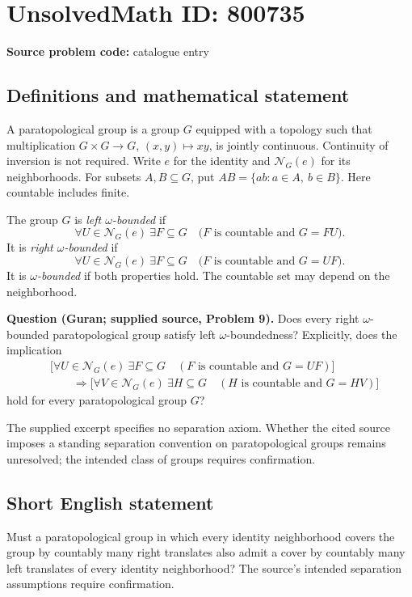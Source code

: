 \documentclass[11pt]{article}
\begin{document}
\section*{UnsolvedMath ID: 800735}
\textbf{Source problem code:} catalogue entry
\subsection{Definitions and mathematical statement}
A paratopological group is a group \(G\) equipped with a topology such that multiplication \(G\times G\to G\), \((x,y)\mapsto xy\), is jointly continuous. Continuity of inversion is not required. Write \(e\) for the identity and \(\mathcal N_G(e)\) for its neighborhoods. For subsets \(A,B\subseteq G\), put \(AB=\{ab:a\in A,\ b\in B\}\). Here countable includes finite.

The group \(G\) is \emph{left \(\omega\)-bounded} if
\[
\forall U\in\mathcal N_G(e)\ \exists F\subseteq G\quad
\bigl(F\text{ is countable and }G=FU\bigr).
\]
It is \emph{right \(\omega\)-bounded} if
\[
\forall U\in\mathcal N_G(e)\ \exists F\subseteq G\quad
\bigl(F\text{ is countable and }G=UF\bigr).
\]
It is \emph{\(\omega\)-bounded} if both properties hold. The countable set may depend on the neighborhood.

\textbf{Question (Guran; supplied source, Problem 9).} Does every right \(\omega\)-bounded paratopological group satisfy left \(\omega\)-boundedness? Explicitly, does the implication
\[
\begin{aligned}
&\bigl[\forall U\in\mathcal N_G(e)\ \exists F\subseteq G\quad
(F\text{ is countable and }G=UF)\bigr]\\
&\qquad\Longrightarrow
\bigl[\forall V\in\mathcal N_G(e)\ \exists H\subseteq G\quad
(H\text{ is countable and }G=HV)\bigr]
\end{aligned}
\]
hold for every paratopological group \(G\)?

The supplied excerpt specifies no separation axiom. Whether the cited source imposes a standing separation convention on paratopological groups remains unresolved; the intended class of groups requires confirmation.
\subsection{Short English statement}
Must a paratopological group in which every identity neighborhood covers the group by countably many right translates also admit a cover by countably many left translates of every identity neighborhood? The source's intended separation assumptions require confirmation.
\end{document}
